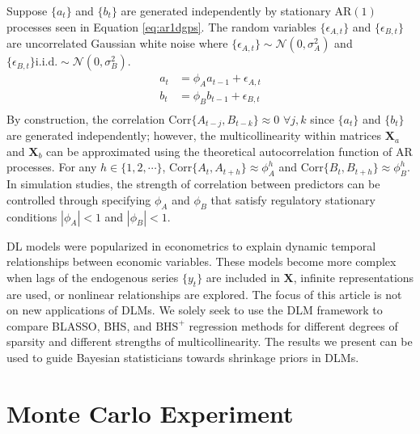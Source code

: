 Suppose $\{a_t\}$ and $\{b_t\}$ are generated independently by stationary AR$(1)$ processes seen in Equation \ref{eq:ar1dgps}. The random variables $\{\epsilon_{A,t}\}$ and $\{\epsilon_{B,t}\}$ are uncorrelated Gaussian white noise where $\{\epsilon_{A,t}\}\sim \mathcal{N}(0,\sigma^2_A)$ and $\{\epsilon_{B,t}\}\textrm{i.i.d.}\sim \mathcal{N}(0,\sigma^2_B)$.
\begin{equation}
\label{eq:ar1dgps}
\begin{split}
 a_t&=\phi_A a_{t-1}+\epsilon_{A,t} \\
 b_t&=\phi_B b_{t-1}+\epsilon_{B,t} \\
\end{split}
\end{equation}
By construction, the correlation Corr$\{A_{t-j},B_{t-k}\}\approx 0$ $\forall j,k$ since $\{a_t\}$ and $\{b_t\}$ are generated independently; however, the multicollinearity within matrices $\bm{X}_a$ and $\bm{X}_b$ can be approximated using the theoretical autocorrelation function of AR processes. For any $h\in \{1,2,\cdots\}$, Corr$\{A_{t},A_{t+h}\}\approx\phi_A^h$ and Corr$\{B_{t},B_{t+h}\}\approx\phi_B^h$. In simulation studies, the strength of correlation between predictors can be controlled through specifying $\phi_A$ and $\phi_B$ that satisfy regulatory stationary conditions $|\phi_A|<1$ and $|\phi_B|<1$.

DL models were popularized in econometrics to explain dynamic temporal relationships between economic variables. These models become more complex when lags of the endogenous series $\{y_t\}$ are included in $\bm{X}$, infinite representations are used, or nonlinear relationships are explored. The focus of this article is not on new applications of DLMs. We solely seek to use the DLM framework to compare BLASSO, BHS, and $\textrm{BHS}^+$ regression methods for different degrees of sparsity and different strengths of multicollinearity. The results we present can be used to guide Bayesian statisticians towards shrinkage priors in DLMs.













\bigskip
\section{Monte Carlo Experiment}
\label{sec:mcdlm}

